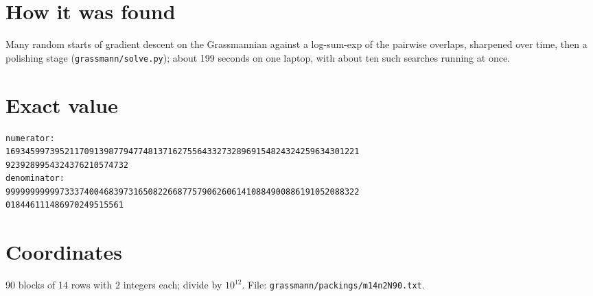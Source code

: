 \documentclass[11pt,a4paper]{article}
\begin{document}
\section{How it was found}
Many random starts of gradient descent on the Grassmannian against a log-sum-exp of the pairwise overlaps, sharpened over time, then a polishing stage (\texttt{grassmann/solve.py}); about 199 seconds on one laptop, with about ten such searches running at once.


\appendix
\section{Exact value}
{\small
\begin{verbatim}
numerator:
169345997395211709139877947748137162755643327328969154824324259634301221
9239289954324376210574732
denominator:
999999999997333740046839731650822668775790626061410884900886191052088322
018446111486970249515561
\end{verbatim}}

\section{Coordinates}
90 blocks of 14 rows with 2 integers each; divide by $10^{12}$. File: \texttt{grassmann/packings/m14n2N90.txt}.
{\tiny
\begin{multicols}{4}
\end{multicols}}
\end{document}
